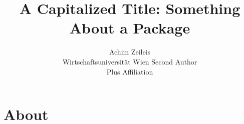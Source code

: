 \documentclass[article]{jss}
\author{Achim Zeileis\\Wirtschaftsuniversit\"at Wien \And 
        Second Author\\Plus Affiliation}
\title{A Capitalized Title: Something About a Package \pkg{foo}}
\begin{document}

\section[About Java]{About }
\end{document}
